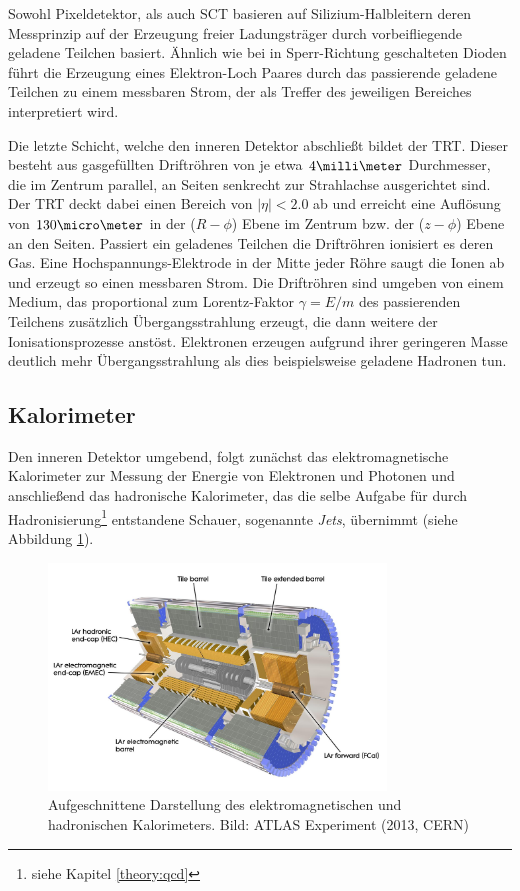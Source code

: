 Sowohl Pixeldetektor, als auch \ac{SCT} basieren auf Silizium-Halbleitern deren
Messprinzip auf der Erzeugung freier Ladungsträger durch vorbeifliegende
geladene Teilchen basiert. Ähnlich wie bei in Sperr-Richtung geschalteten
Dioden führt die Erzeugung eines Elektron-Loch Paares durch das passierende
geladene Teilchen zu einem messbaren Strom, der als Treffer des jeweiligen
Bereiches interpretiert wird.

Die letzte Schicht, welche den inneren Detektor abschließt bildet der
\acf{TRT}.  Dieser besteht aus gasgefüllten Driftröhren von je etwa
$4\milli\meter$ Durchmesser, die im Zentrum parallel, an Seiten senkrecht zur
Strahlachse ausgerichtet sind. Der \ac{TRT} deckt dabei einen Bereich von
$|\eta|<2.0$ ab und erreicht eine Auflösung von $130\micro\meter$ in der
($R-\phi$) Ebene im Zentrum bzw. der ($z-\phi$) Ebene an den Seiten. Passiert
ein geladenes Teilchen die Driftröhren ionisiert es deren Gas. Eine
Hochspannungs-Elektrode in der Mitte jeder Röhre saugt die Ionen ab und erzeugt
so einen messbaren Strom. Die Driftröhren sind umgeben von einem Medium, das
proportional zum Lorentz-Faktor $\gamma=E/m$ des passierenden Teilchens
zusätzlich Übergangsstrahlung erzeugt, die dann weitere der Ionisationsprozesse
anstöst. Elektronen erzeugen aufgrund ihrer geringeren Masse deutlich mehr
Übergangsstrahlung als dies beispielsweise geladene Hadronen tun.



\subsection{Kalorimeter}
\label{calorimeter}

Den inneren Detektor umgebend, folgt zunächst das elektromagnetische
Kalorimeter zur Messung der Energie von Elektronen und Photonen und
anschließend das hadronische Kalorimeter, das die selbe Aufgabe für durch
Hadronisierung\footnote{siehe Kapitel \ref{theory:qcd}} entstandene Schauer,
sogenannte \textit{Jets}, übernimmt (siehe Abbildung \ref{fig:calorimeter}).

\begin{figure}
    \centering
    \includegraphics[width=0.8\textwidth]{img/calorimeter}
    \caption[Darstellung der Kalorimeter]
        {Aufgeschnittene Darstellung des elektromagnetischen und hadronischen
        Kalorimeters. Bild: ATLAS Experiment (2013, CERN)}
    \label{fig:calorimeter}
\end{figure}

